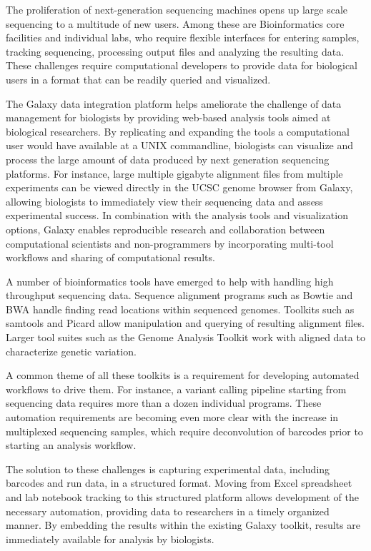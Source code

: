 \documentclass[10pt]{bmc_article}
\newenvironment{bmcformat}{\begin{raggedright}\baselineskip20pt\sloppy\setboolean{publ}{false}}{\end{raggedright}\baselineskip20pt\sloppy}
\begin{document}
\begin{bmcformat}
The proliferation of next-generation sequencing machines opens up
large scale sequencing to a multitude of new users. Among these are
Bioinformatics core facilities and individual labs, who require
flexible interfaces for entering samples, tracking sequencing,
processing output files and analyzing the resulting data. These
challenges require computational developers to provide data for
biological users in a format that can be readily queried and
visualized.

The Galaxy data integration platform \cite{goecks_galaxy:_2010}
helps ameliorate the challenge of data management for biologists
by providing web-based analysis tools aimed at biological
researchers. By replicating and expanding the tools a computational
user would have available at a UNIX commandline, biologists can
visualize and process the large amount of data produced by next
generation sequencing platforms. For instance, large multiple gigabyte
alignment files from multiple experiments can be viewed directly
in the UCSC genome browser \cite{fujita_ucsc_2011} from Galaxy,
allowing biologists to immediately view their sequencing data
and assess experimental success. In combination with the analysis
tools and visualization options, Galaxy enables reproducible research
and collaboration between computational scientists and non-programmers by
incorporating multi-tool workflows and sharing of computational
results.

A number of bioinformatics tools have emerged to help with handling
high throughput sequencing data. Sequence alignment programs such as
Bowtie \cite{langmead_ultrafast_2009} and BWA \cite{li_fast_2009}
handle finding read locations within sequenced genomes. Toolkits such
as samtools \cite{li_sequence_2009} and Picard \cite{_picard_????}
allow manipulation and querying of resulting alignment files. Larger
tool suites such as the Genome Analysis Toolkit
\cite{mckenna_genome_2010} work with aligned data to characterize
genetic variation.

A common theme of all these toolkits is a requirement for developing
automated workflows to drive them. For instance, a variant calling
pipeline starting from sequencing data requires more than a dozen
individual programs. These automation requirements are becoming
even more clear with the increase in multiplexed sequencing samples,
which require deconvolution of barcodes prior to starting an analysis
workflow.

The solution to these challenges is capturing experimental data,
including barcodes and run data, in a structured format. Moving from
Excel spreadsheet and lab notebook tracking to this structured
platform allows development of the necessary automation, providing
data to researchers in a timely organized manner. By embedding the
results within the existing Galaxy toolkit, results are immediately
available for analysis by biologists.


\end{bmcformat}
\end{document}
